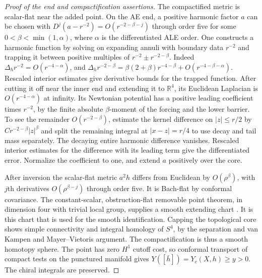 \documentclass[11pt]{article}
\numberwithin{equation}{section}
\theoremstyle{definition}
\theoremstyle{remark}
\newcommand{\R}{\mathbb R}
\begin{document}
\begin{proof}[Proof of the end and compactification assertions]
The compactified metric is scalar-flat near the added point.
On the AE end, a positive harmonic factor
\(a\) can be chosen with
\(D^j(a-r^{-2})=O(r^{-2-\beta-j})\) through order five for
some \(0<\beta<\min(1,\alpha)\), where \(\alpha\) is the
differentiated ALE order. One constructs a harmonic function
by solving on expanding annuli with boundary data \(r^{-2}\)
and trapping it between positive multiples of
\(r^{-2}\pm r^{-2-\beta}\). Indeed
\(\Delta_h r^{-2}=O(r^{-4-\alpha})\), and
\(\Delta_h r^{-2-\beta}=\beta(2+\beta)r^{-4-\beta}
+O(r^{-4-\beta-\alpha})\). Rescaled interior estimates
give derivative bounds for the trapped function. After cutting
it off near the inner end and extending it to \(\R^4\), its
Euclidean Laplacian is \(O(r^{-4-\alpha})\) at infinity.
Its Newtonian potential has a positive leading coefficient
times \(r^{-2}\), by the finite absolute \(\beta\)-moment of
the forcing and the lower barrier. To see the remainder
\(O(r^{-2-\beta})\), estimate the kernel difference on
\(|z|\le r/2\) by \(Cr^{-2-\beta}|z|^\beta\) and split the
remaining integral at \(|x-z|=r/4\) to use decay and tail
mass separately. The decaying entire harmonic difference
vanishes. Rescaled interior estimates for the difference
with its leading term give the differentiated error.
Normalize the coefficient to one, and extend \(a\) positively
over the core.

After inversion the scalar-flat metric \(a^2h\) differs from
Euclidean by \(O(\rho^\beta)\), with \(j\)th derivatives
\(O(\rho^{\beta-j})\) through order five. It is Bach-flat
by conformal covariance. The constant-scalar,
obstruction-flat removable point theorem, in dimension four
with trivial local group, supplies a smooth extending chart
\cite[Definition 1.6, Theorem 1.8 and Remark 7.2]{AcheViaclovsky2011Obstruction}.
It is this chart that is used for the smooth identification.
Capping the topological core shows simple connectivity and
integral homology of \(S^4\), by the separation and
van Kampen and Mayer--Vietoris argument. The compactification
is thus a smooth homotopy sphere. The point has zero
\(H^1\) cutoff cost, so conformal transport of compact tests
on the punctured manifold gives
\(Y([\bar h])=Y_c(X,h)\ge y>0\).
The chiral integrals are preserved.
\end{proof}
\end{document}

